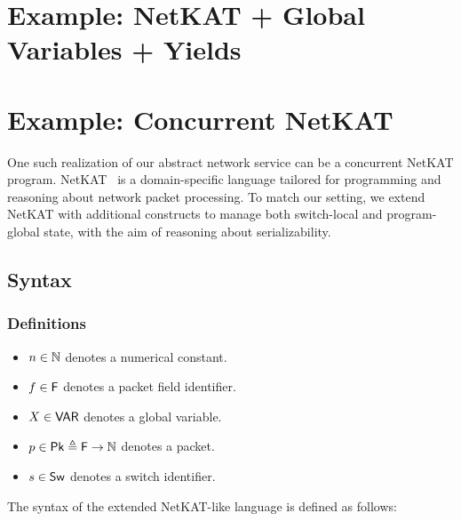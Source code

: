 \section{Example: NetKAT + Global Variables + Yields}
\label{sec:exampleNetKat}

\section{Example: Concurrent NetKAT}

One such realization of our abstract network service can be a concurrent NetKAT 
program. 
%
NetKAT~\cite{AnDoGuJeKoScWa14} is a domain-specific language tailored for 
programming and reasoning 
about network packet processing. 
%
To match our setting, we extend NetKAT with additional 
constructs to manage both switch-local and program-global state, with the aim 
of reasoning about serializability.



\subsection{Syntax}

\subsubsection{Definitions}

\begin{itemize}
	\item \( n \in \mathbb{N} \) denotes a numerical constant.
	\item \( f \in \mathsf{F} \) denotes a packet field identifier.
	\item \( X \in \mathsf{VAR} \) denotes a global variable.
	\item \( p \in \mathsf{Pk} \triangleq \mathsf{F} \to \mathbb{N} \) denotes a packet.
	\item \( s \in \mathsf{Sw} \) denotes a switch identifier.
	
	
\end{itemize}


The syntax of the extended NetKAT-like language is defined as follows:

